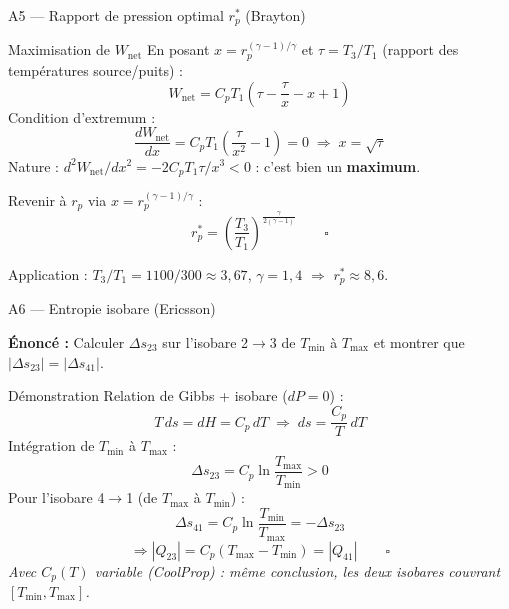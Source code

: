 \documentclass[aspectratio=43, 10pt]{beamer}
\newcommand{\Tmin}{T_{\min}}
\newcommand{\Tmax}{T_{\max}}
\newcommand{\rp}{r_p}
\newcommand{\Wnet}{W_{\text{net}}}
\begin{document}
\begin{frame}{A5 --- Rapport de pression optimal $\rp^*$ (Brayton)}

  \begin{block}{Maximisation de $\Wnet$}
    En posant $x = \rp^{(\gamma-1)/\gamma}$ et
    $\tau = T_3/T_1$ (rapport des temp\'eratures source/puits) :
    \[
      \Wnet = C_p T_1\!\left(\tau - \frac{\tau}{x} - x + 1\right)
    \]
    Condition d'extremum :
    \[
      \frac{d\Wnet}{dx}
      = C_p T_1\!\left(\frac{\tau}{x^2} - 1\right) = 0
      \;\Rightarrow\; x = \sqrt{\tau}
    \]
    Nature : $d^2\Wnet/dx^2 = -2C_p T_1\tau/x^3 < 0$ :
    c'est bien un \textbf{maximum}.

    Revenir \`a $\rp$ via $x = \rp^{(\gamma-1)/\gamma}$ :
    \[
      \boxed{\rp^* = \left(\frac{T_3}{T_1}
             \right)^{\!\!\frac{\gamma}{2(\gamma-1)}}}
      \qquad\square
    \]

    Application : $T_3/T_1 = 1100/300 \approx 3{,}67$,
    $\gamma = 1{,}4$ $\Rightarrow$ $\rp^* \approx 8{,}6$.
  \end{block}

\end{frame}

\begin{frame}{A6 --- Entropie isobare (Ericsson)}

  \textbf{\'Enonc\'e :} Calculer $\Delta s_{23}$ sur l'isobare 2$\to$3
  de $\Tmin$ \`a $\Tmax$ et montrer que $|\Delta s_{23}| = |\Delta s_{41}|$.

  \begin{block}{D\'emonstration}
    \small
    Relation de Gibbs + isobare ($dP=0$) :
    \[
      T\,ds = dH = C_p\,dT
      \;\Rightarrow\;
      ds = \frac{C_p}{T}\,dT
    \]
    Int\'egration de $\Tmin$ \`a $\Tmax$ :
    \[
      \Delta s_{23} = C_p\ln\!\frac{\Tmax}{\Tmin} > 0
    \]
    Pour l'isobare 4$\to$1 (de $\Tmax$ \`a $\Tmin$) :
    \[
      \Delta s_{41} = C_p\ln\!\frac{\Tmin}{\Tmax}
      = -\Delta s_{23}
    \]
    \vspace{-6pt}
    \[
      \Rightarrow |Q_{23}| = C_p(\Tmax-\Tmin) = |Q_{41}|
      \qquad\square
    \]
    \vspace{-4pt}
    \small\textit{Avec $C_p(T)$ variable (CoolProp) : m\^eme
    conclusion, les deux isobares couvrant $[\Tmin,\Tmax]$.}
  \end{block}

\end{frame}
\end{document}
